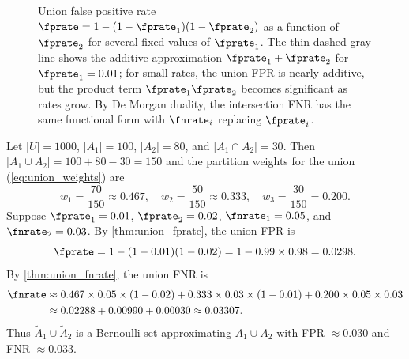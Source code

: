 \begin{figure}[ht]
\centering
{}
\caption{Union false positive rate
$\fprate = 1 - (1-\fprate_1)(1-\fprate_2)$ as a function of $\fprate_2$
for several fixed values of $\fprate_1$.
The thin dashed gray line shows the additive approximation
$\fprate_1 + \fprate_2$ for $\fprate_1 = 0.01$;
for small rates, the union FPR is nearly additive, but the
product term $\fprate_1 \fprate_2$ becomes significant as rates grow.
By De Morgan duality, the intersection FNR has the same functional form
with $\fnrate_i$ replacing $\fprate_i$.}
\label{fig:union_fpr}
\end{figure}

\begin{example}
\label{ex:numerical_union}
Let $|U| = 1000$, $|A_1| = 100$, $|A_2| = 80$, and $|A_1 \cap A_2| = 30$.
Then $|A_1 \cup A_2| = 100 + 80 - 30 = 150$ and the partition weights for the union (\cref{eq:union_weights}) are
\begin{equation}
w_1 = \frac{70}{150} \approx 0.467, \quad
w_2 = \frac{50}{150} \approx 0.333, \quad
w_3 = \frac{30}{150} = 0.200.
\end{equation}
Suppose $\fprate_1 = 0.01$, $\fprate_2 = 0.02$, $\fnrate_1 = 0.05$, and $\fnrate_2 = 0.03$.
By \cref{thm:union_fprate}, the union FPR is
\begin{equation}
\fprate = 1 - (1 - 0.01)(1 - 0.02) = 1 - 0.99 \times 0.98 = 0.0298.
\end{equation}
By \cref{thm:union_fnrate}, the union FNR is
\begin{align}
\fnrate &\approx 0.467 \times 0.05 \times (1 - 0.02)
         + 0.333 \times 0.03 \times (1 - 0.01)
         + 0.200 \times 0.05 \times 0.03 \notag \\
       &\approx 0.02288 + 0.00990 + 0.00030 \approx 0.03307.
\end{align}
Thus $\tilde{A}_1 \cup \tilde{A}_2$ is a Bernoulli set approximating $A_1 \cup A_2$ with FPR $\approx 0.030$ and FNR $\approx 0.033$.
\end{example}


